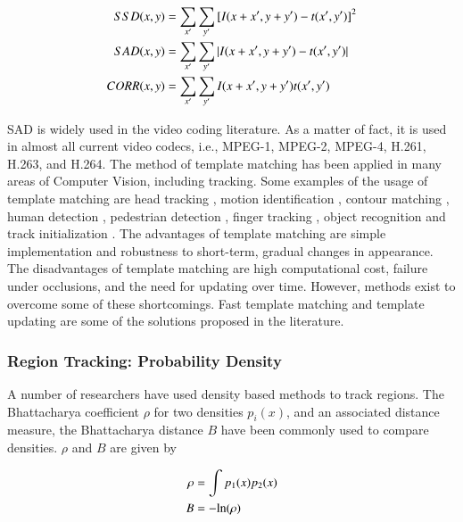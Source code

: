 \documentclass[12pt,letterpaper,doublespaced,ETD,proposal]{gt-ece-thesis}
\begin{document}
\begin{Body}
\begin{align}
SSD(x,y)  &=\sum_{x'}\sum_{y'} {[I(x+x', y+y')-t(x', y')]}^2 \notag\\
SAD(x,y)  &=\sum_{x'}\sum_{y'} |I(x+x', y+y')-t(x', y')| \\
CORR(x,y) &=\sum_{x'}\sum_{y'} I(x+x', y+y') t(x', y') \notag
\end{align}

SAD is widely used in the video coding literature.  As a matter of fact, it is used in almost all current video codecs, i.e., MPEG-1, MPEG-2, MPEG-4, H.261, H.263, and H.264.  The method of template matching has been applied in many areas of Computer Vision, including tracking.  Some examples of the usage of template matching are head tracking \cite{1998_CNF_HeadTracking_Birchfield}, motion identification \cite{1998_CNF_Tracking_Lipton, 2001_JNL_MotionTemplates_Bobick}, contour matching \cite{2009_CNF_HumanDetection_Beleznai}, human detection \cite{2010_JNL_HumanDetectionSegmentation_Lin}, pedestrian detection \cite{1997_CNF_PedestrianDetection_Oren}, finger tracking \cite{1995_CNF_Tracking_Rehg}, object recognition \cite{2000_CNF_MLtemplateMatching_Olson} and track initialization \cite{1998_CNF_Tracking_Lipton, 2010_CNF_TrkRVQ_Aslam}.  The advantages of template matching are simple implementation and robustness to short-term, gradual changes in appearance.  The disadvantages of template matching are high computational cost, failure under occlusions, and the need for updating over time.  However, methods exist to overcome some of these shortcomings.  Fast template matching \cite{2002_CNF_FastTemplateMatching_SchweitzerBellWu} and template updating are some of the solutions \cite{1998_CNF_Tracking_Lipton} proposed in the literature.

\subsubsection{Region Tracking: Probability Density}
A number of researchers have used density based methods to track regions.  The Bhattacharya coefficient $\rho$ for two densities $p_i(x)$, and an associated distance measure, the Bhattacharya distance $B$ \cite{1967_JNL_Bhattacharyya_Kailath} have been commonly used to compare densities.  $\rho$ and $B$ are given by 

\begin{align}
\rho &= \int p_1(x)p_2(x) \notag\\
B &= -\text{ln}(\rho)
\label{Eq:Bhattacharya}
\end{align}


\end{Body}
\end{document}
